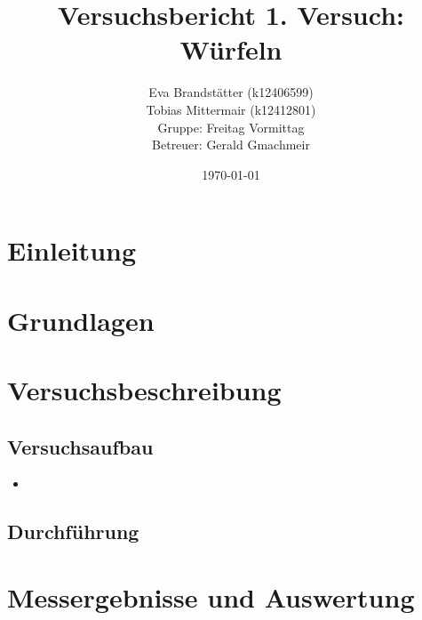 \documentclass[a4paper,12pt]{article}
\title{Versuchsbericht 1. Versuch: \\ \textbf{Würfeln}}
\author{Eva Brandstätter (k12406599)\\Tobias Mittermair (k12412801)\\Gruppe: Freitag Vormittag\\Betreuer: Gerald Gmachmeir}
\date{\today}
\begin{document}
\maketitle

\section*{Einleitung}


\section*{Grundlagen}

\section*{Versuchsbeschreibung}
\subsection*{Versuchsaufbau}


\begin{itemize}[noitemsep,topsep=0pt,parsep=0pt,partopsep=0pt]
    \item 
\end{itemize}

\subsection*{Durchführung}

\section*{Messergebnisse und Auswertung}

\end{document}
